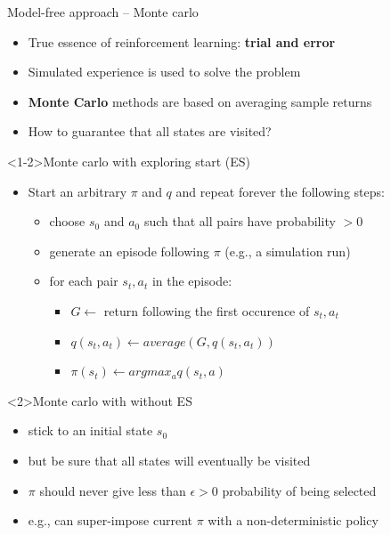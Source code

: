 \documentclass[presentation, 9pt]{beamer}\mode<presentation>{\usetheme{AMSBolognaFC}}
\begin{document}
\begin{frame}{Model-free approach -- Monte carlo}
	\begin{itemize}
		\item True essence of reinforcement learning: \textbf{trial and error}
		\item Simulated experience is used to solve the problem
		\item \textbf{Monte Carlo} methods are based on averaging sample returns
		\item How to guarantee that all states are visited?
	\end{itemize}
	\begin{alertblock}<1-2>{Monte carlo with exploring start (ES)}
		\begin{itemize}
			\item Start an arbitrary $\pi$ and $q$ and repeat forever the following steps:
			\begin{itemize}
				\item choose $s_0$ and $a_0$ such that all pairs have probability $> 0$
				\item generate an episode following $\pi$ (e.g., a simulation run)
				\item for each pair $s_t, a_t$ in the episode:
				\begin{itemize}
					\item $G \leftarrow$ return following the first occurence of $s_t, a_t$
					\item $q(s_t, a_t) \leftarrow average(G, q(s_t, a_t))$
					\item $\pi(s_t) \leftarrow argmax_a q(s_t, a)$
				\end{itemize}
			\end{itemize}
		\end{itemize}
	\end{alertblock}
	\begin{alertblock}{Monte carlo with without ES}
		\begin{itemize}
			\item stick to an initial state $s_0$ 
			\item but be sure that all states will eventually be visited
			\item $\pi$ should never give less than $\epsilon > 0$ probability of being selected
			\item e.g., can super-impose current $\pi$ with a non-deterministic policy
		\end{itemize}
	\end{alertblock}
\end{frame}
\end{document}
